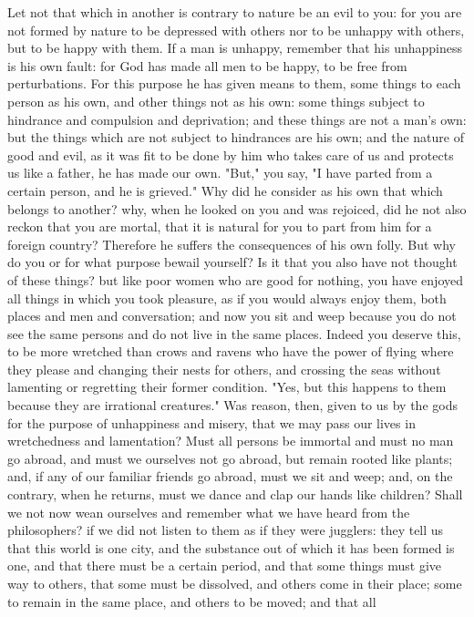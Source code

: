 \documentclass[a4paper]{article}
\begin{document}
    Let not that which in another is contrary to nature be an evil to you: for
you are not formed by nature to be depressed with others nor to be unhappy with
others, but to be happy with them. If a man is unhappy, remember that his
unhappiness is his own fault: for God has made all men to be happy, to be free
from perturbations. For this purpose he has given means to them, some things to
each person as his own, and other things not as his own: some things subject to
hindrance and compulsion and deprivation; and these things are not a man's own:
but the things which are not subject to hindrances are his own; and the nature
of good and evil, as it was fit to be done by him who takes care of us and
protects us like a father, he has made our own. "But," you say, "I have parted
from a certain person, and he is grieved." Why did he consider as his own that
which belongs to another? why, when he looked on you and was rejoiced, did he
not also reckon that you are mortal, that it is natural for you to part from
him for a foreign country? Therefore he suffers the consequences of his own
folly. But why do you or for what purpose bewail yourself? Is it that you also
have not thought of these things? but like poor women who are good for nothing,
you have enjoyed all things in which you took pleasure, as if you would always
enjoy them, both places and men and conversation; and now you sit and weep
because you do not see the same persons and do not live in the same places.
Indeed you deserve this, to be more wretched than crows and ravens who have the
power of flying where they please and changing their nests for others, and
crossing the seas without lamenting or regretting their former condition. "Yes,
but this happens to them because they are irrational creatures." Was reason,
then, given to us by the gods for the purpose of unhappiness and misery, that
we may pass our lives in wretchedness and lamentation? Must all persons be
immortal and must no man go abroad, and must we ourselves not go abroad, but
remain rooted like plants; and, if any of our familiar friends go abroad, must
we sit and weep; and, on the contrary, when he returns, must we dance and clap
our hands like children?
    Shall we not now wean ourselves and remember what we have heard from the
philosophers? if we did not listen to them as if they were jugglers: they tell
us that this world is one city, and the substance out of which it has been
formed is one, and that there must be a certain period, and that some things
must give way to others, that some must be dissolved, and others come in their
place; some to remain in the same place, and others to be moved; and that all
\end{document}
